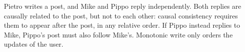 \begin{example}
Pietro writes a post, and Mike and Pippo reply independently. Both replies are causally related to the post, but not to each other: causal consistency requires them to appear after the post, in any relative order. If Pippo instead replies to Mike, Pippo's post must also follow Mike's. Monotonic write only orders the updates of the  user.
\end{example}
